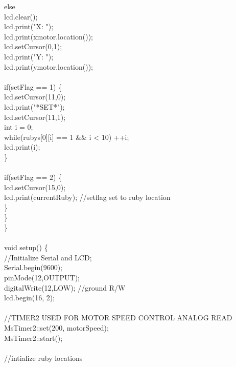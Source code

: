 \tabto*{.5cm} else {\\
\tabto*{1cm} lcd.clear();\\
\tabto*{1cm} lcd.print("X: ");\\
\tabto*{1cm} lcd.print(xmotor.location());\\
\tabto*{1cm} lcd.setCursor(0,1);\\
\tabto*{1cm} lcd.print("Y: ");\\
\tabto*{1cm} lcd.print(ymotor.location());\\
\\		
\tabto*{1cm} if(setFlag == 1) \{\\
\tabto*{1.5cm} lcd.setCursor(11,0);\\
\tabto*{1.5cm} lcd.print("*SET*");\\
\tabto*{1.5cm} lcd.setCursor(11,1);\\
\tabto*{1.5cm} int i = 0;\\
\tabto*{1.5cm} while(rubys[0][i] == 1 \&\& i < 10) ++i;\\
\tabto*{1.5cm} lcd.print(i);\\
\tabto*{1cm} \}\\
\\		
\tabto*{1cm} if(setFlag == 2) \{\\
\tabto*{1.5cm} lcd.setCursor(15,0);\\
\tabto*{1.5cm} lcd.print(currentRuby);\tabto*{7.5cm}  //setflag set to ruby location\\
\tabto*{1cm} \}\\
\tabto*{.5cm} \}\\
\}\\
\\
void setup() \{\\	
\tabto*{.5cm} //Initialize Serial and LCD;\\
\tabto*{.5cm} Serial.begin(9600);\\
\tabto*{.5cm} pinMode(12,OUTPUT);\\
\tabto*{.5cm} digitalWrite(12,LOW);  //ground R/W\\
\tabto*{.5cm} lcd.begin(16, 2);\\
\\	
\tabto*{.5cm} //TIMER2 USED FOR MOTOR SPEED CONTROL ANALOG READ\\
\tabto*{.5cm} MsTimer2::set(200, motorSpeed);  \\
\tabto*{.5cm} MsTimer2::start();\\
\\	
\tabto*{.5cm} //intialize ruby locations\\
}
